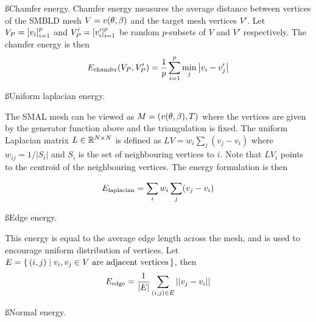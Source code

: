 \ss{Chamfer energy.} Chamfer energy measures the average distance between vertices of the SMBLD mesh $V = v(\theta,\beta)$ and the target mesh vertices $V'$. Let $V_{P} = \left[{v_{i}}\right]_{i=1}^{p}$ and $V'_{P} = \left[{v'_{i}}\right]_{i=1}^{p}$ be random $p$-subsets of $V$ and $V'$ respectively. The chamfer energy is then
\begin{equation}
        E_\textrm{chamfer}(V_{P}, V'_{P}) = \frac{1}{p} \sum_{i=1}^{p} \min_{j}  \left | v_{i} - v'_{j} \right |
\end{equation}

\ss{Uniform laplacian energy.} 



The SMAL mesh can be viewed as $M = (v(\theta,\beta), T)$ where the vertices are given by the generator function above and the triangulation is fixed. The uniform Laplacian matrix $L \in {\mathbb{R}^{N \times N}}$ is defined as $LV = w_{i} \sum_{j} (v_{j} - v_{i})$ where $w_{ij} = 1 / |S_{i}|$ and $S_{i}$ is the set of neighbouring vertices to $i$. Note that $LV_{i}$ points to the centroid of the neighbouring vertices. The energy formulation is then

\begin{equation}
    E_\textrm{laplacian} = \sum_{i} w_{i} \sum_{j} (v_{j} - v_{i})
\end{equation}



\ss{Edge energy.} 

This energy is equal to the average edge length across the mesh, and is used to encourage uniform distribution of vertices. Let $E = \{\,(i,j)\mid\text{$v_{i}, v_{j} \in V$ are adjacent vertices}\,\}$, then
\begin{equation}
    E_\textrm{edge} = \frac{1}{|E|} \sum_{(i,j) \in E} || v_{j} - v_{i} ||
\end{equation}

\ss{Normal energy.} 


